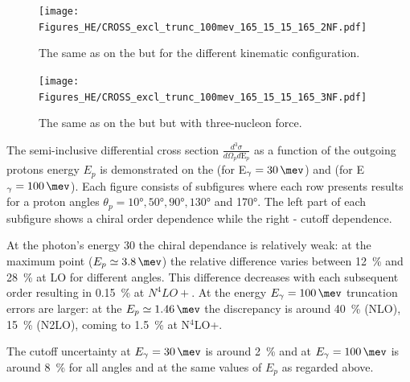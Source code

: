         \begin{figure}[h]
            \begin{center}
                \texttt{[image: Figures\_HE/CROSS\_excl\_trunc\_100mev\_165\_15\_15\_165\_2NF.pdf]}
                \end{center}
                \caption{The same as on the  but for the different kinematic
                configuration.}
                \label{CROSS_HE_EXCL_165_15_15_165}
        \end{figure}

        \begin{figure}[h]
            \begin{center}
                \texttt{[image: Figures\_HE/CROSS\_excl\_trunc\_100mev\_165\_15\_15\_165\_3NF.pdf]}
                \end{center}
                \caption{The same as on the  but but with three-nucleon force.}
                \label{CROSS_HE_EXCL_165_15_15_165_3NF}
        \end{figure}

        The semi-inclusive differential cross section $\frac{d^3\sigma}{d\Omega_p d\text{E}_p}$
        as a function of the outgoing protons energy $E_p$ is demonstrated on the
         (for E$_\gamma = \SI{30}{\mev}$) and
         (for E$_\gamma = \SI{100}{\mev}$).
        Each figure consists of subfigures where each row presents results
        for a proton angles $\theta_p = \ang{10}, \ang{50}, \ang{90}, \ang{130}$ and \ang{170}.
        The left part of each subfigure shows a chiral order dependence while the right - cutoff dependence.
        
        At the photon's energy \SI{30}{\mev} the chiral dependance is relatively weak: at the maximum point
        ($E_p \simeq \SI{3.8}{\mev}$) the relative difference varies between \SI{12}{\percent} and 
        \SI{28}{\percent} at LO for different angles. This difference decreases with each subsequent order
        resulting in \SI{0.15}{\percent} at $N^4LO+$. At the energy $E_\gamma = \SI{100}{\mev}$ truncation errors
        are larger: at the $E_p \simeq \SI{1.46}{\mev}$ the discrepancy is around \SI{40}{\percent} (NLO),
        \SI{15}{\percent} (N2LO), coming to \SI{1.5}{\percent} at N$^4$LO+.

        The cutoff uncertainty at $E_\gamma = \SI{30}{\mev}$ is around \SI{2}{\percent}
        and at $E_\gamma = \SI{100}{\mev}$ is around \SI{8}{\percent} for all angles and 
        at the same values of $E_p$ as regarded above.


